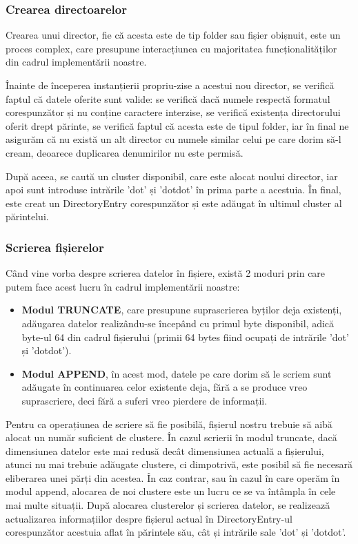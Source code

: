 \subsubsection{Crearea directoarelor}

Crearea unui director, fie că acesta este de tip folder sau fișier obișnuit, este un proces complex, care presupune interacțiunea cu majoritatea funcționalităților din cadrul implementării noastre.

Înainte de începerea instanțierii propriu-zise a acestui nou director, se verifică faptul că datele oferite sunt valide: se verifică dacă numele respectă formatul corespunzător și nu conține caractere interzise, se verifică existența directorului oferit drept părinte, se verifică faptul că acesta este de tipul folder, iar în final ne asigurăm că nu există un alt director cu numele similar celui pe care dorim să-l cream, deoarece duplicarea denumirilor nu este permisă.

După aceea, se caută un cluster disponibil, care este alocat noului director, iar apoi sunt introduse intrările 'dot' și 'dotdot' în prima parte a acestuia. În final, este creat un DirectoryEntry corespunzător și este adăugat în ultimul cluster al părintelui.


\subsubsection{Scrierea fișierelor}

Când vine vorba despre scrierea datelor în fișiere, există 2 moduri prin care putem face acest lucru în cadrul implementării noastre:

\begin{itemize}
  \item \textbf{Modul TRUNCATE}, care presupune suprascrierea byților deja existenți, adăugarea datelor realizându-se începând cu primul byte disponibil, adică byte-ul 64 din cadrul fișierului (primii 64 bytes fiind ocupați de intrările 'dot' și 'dotdot').

  \item \textbf{Modul APPEND}, în acest mod, datele pe care dorim să le scriem sunt adăugate în continuarea celor existente deja, fără a se produce vreo suprascriere, deci fără a suferi vreo pierdere de informații.
\end{itemize}

Pentru ca operațiunea de scriere să fie posibilă, fișierul nostru trebuie să aibă alocat un număr suficient de clustere. În cazul scrierii în modul truncate, dacă dimensiunea datelor este mai redusă decât dimensiunea actuală a fișierului, atunci nu mai trebuie adăugate clustere, ci dimpotrivă, este posibil să fie necesară eliberarea unei părți din acestea. În caz contrar, sau în cazul în care operăm în modul append, alocarea de noi clustere este un lucru ce se va întâmpla în cele mai multe situații. După alocarea clusterelor și scrierea datelor, se realizează actualizarea informațiilor despre fișierul actual în DirectoryEntry-ul corespunzător acestuia aflat în părintele său, cât și intrările sale 'dot' și 'dotdot'.


